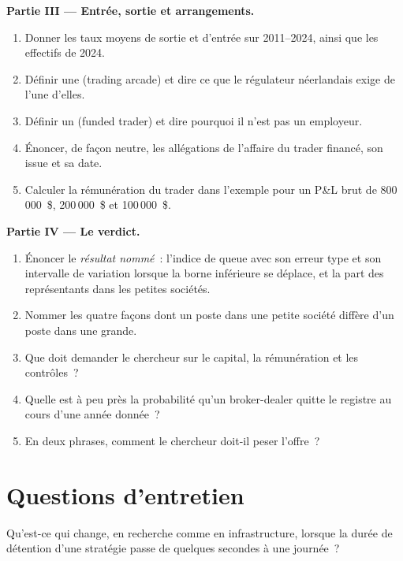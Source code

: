 \begin{problem}
\medskip\noindent\textbf{Partie III --- Entrée, sortie et arrangements.}
\begin{enumerate}[resume]
\item Donner les taux moyens de sortie et d'entrée sur 2011--2024, ainsi que les effectifs de 2024.
\item Définir une  (trading arcade) et dire ce que le régulateur néerlandais exige de l'une d'elles.
\item Définir un  (funded trader) et dire pourquoi il n'est pas un employeur.
\item Énoncer, de façon neutre, les allégations de l'affaire du trader financé, son issue et sa date.
\item Calculer la rémunération du trader dans l'exemple pour un P\&L brut de 800\,000~\$, 200\,000~\$ et 100\,000~\$.
\end{enumerate}

\medskip\noindent\textbf{Partie IV --- Le verdict.}
\begin{enumerate}[resume]
\item Énoncer le \emph{résultat nommé}~: l'indice de queue avec son erreur type et son intervalle de variation lorsque la borne inférieure se déplace, et
la part des représentants dans les petites sociétés.
\item Nommer les quatre façons dont un poste dans une petite société diffère d'un poste dans une grande.
\item Que doit demander le chercheur sur le capital, la rémunération et les contrôles~?
\item Quelle est à peu près la probabilité qu'un broker-dealer quitte le registre au cours d'une année donnée~?
\item En deux phrases, comment le chercheur doit-il peser l'offre~?
\end{enumerate}
\end{problem}

\section{Questions d'entretien}

\begin{interviewq}\label{iq:in:medium-frequency-proprietary-shops:1}
Qu'est-ce qui change, en recherche comme en infrastructure, lorsque la durée de détention d'une stratégie passe de quelques secondes à une journée~?
\end{interviewq}


